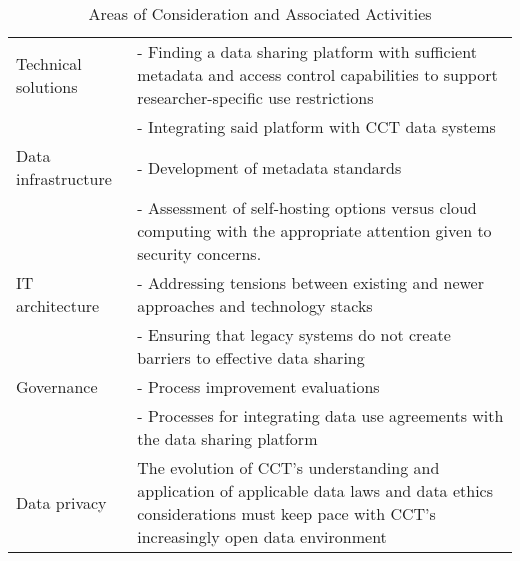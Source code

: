% 

\begin{table}

\caption{\label{tab:ccttable1}Areas of Consideration and Associated Activities}
\centering
\begin{tabulary}{1.0\textwidth}{lL}
\toprule
Technical solutions & - Finding a data sharing platform with sufficient metadata and access control capabilities to support researcher-specific use restrictions\\
                    & - Integrating said platform with CCT data systems\\
Data infrastructure & - Development of metadata standards\\
                    & - Assessment of self-hosting options versus cloud computing with the appropriate attention given to security concerns.\\
IT architecture 	& - Addressing tensions between existing and newer approaches and technology stacks\\
                    & - Ensuring that legacy systems do not create barriers to effective data sharing\\
Governance 	        & - Process improvement evaluations\\
                    & - Processes for integrating data use agreements with the data sharing platform\\
Data privacy        & The evolution of CCT's understanding and application of applicable data laws and data ethics considerations must keep pace with CCT's increasingly open data environment\\
\bottomrule
\end{tabulary}
\end{table}